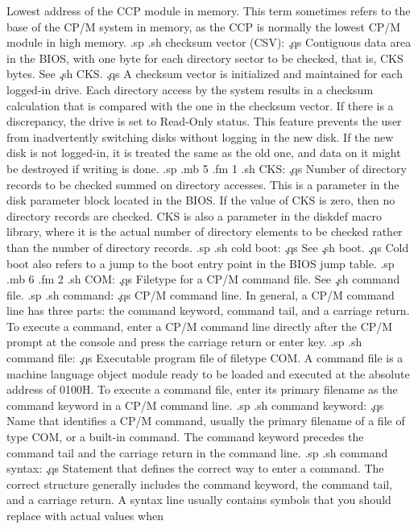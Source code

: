 Lowest address of the CCP module in memory.  This term sometimes 
refers to the base of the CP/M system in memory, as the CCP is 
normally the lowest CP/M module in high memory.
.sp
.sh
checksum vector (CSV):  \c
.qs
Contiguous data area in the BIOS, with one byte for each 
directory sector to be checked, that is, CKS bytes.  See \c
.sh
CKS.  \c
.qs
A checksum vector is initialized and maintained for each logged-in 
drive.  Each directory access by the system results in a checksum 
calculation that is compared with the one in the checksum vector.  
If there is a discrepancy, the drive is set to Read-Only status.  
This feature prevents the user from inadvertently switching disks 
without logging in the new disk.  If the new disk is not logged-in, 
it is treated the same as the old one, and data on it might be 
destroyed if writing is done.
.sp
.mb 5
.fm 1
.sh
CKS:  \c
.qs
Number of directory records to be checked summed on directory 
accesses.  This is a parameter in the disk parameter block 
located in the BIOS.  If the value of CKS is zero, then no 
directory records are checked.  CKS is also a parameter in the 
diskdef macro library, where it is the actual number of directory 
elements to be checked rather than the number of directory 
records.
.sp
.sh
cold boot:  \c
.qs
See \c
.sh
boot.  \c
.qs
Cold boot also refers to a jump to the boot entry point in the 
BIOS jump table.
.sp
.mb 6
.fm 2
.sh
COM:  \c
.qs
Filetype for a CP/M command file.  See \c
.sh
command file.
.sp
.sh
command:  \c
.qs
CP/M command line.  In general, a CP/M command line has three 
parts:  the command keyword, command tail, and a carriage return.  
To execute a command, enter a CP/M command line directly after 
the CP/M prompt at the console and press the carriage return or 
enter key.
.sp
.sh
command file:  \c
.qs
Executable program file of filetype COM.  A command file is a 
machine language object module ready to be loaded and executed at 
the absolute address of 0100H.  To execute a command file, enter 
its primary filename as the command keyword in a CP/M command 
line.
.sp
.sh
command keyword:  \c
.qs
Name that identifies a CP/M command, usually the primary filename 
of a file of type COM, or a built-in command.  The command 
keyword precedes the command tail and the carriage return in the 
command line.
.sp
.sh
command syntax:  \c
.qs
Statement that defines the correct way to enter a command.  The 
correct structure generally includes the command keyword, the 
command tail, and a carriage return.  A syntax line usually 
contains symbols that you should replace with actual values when 
